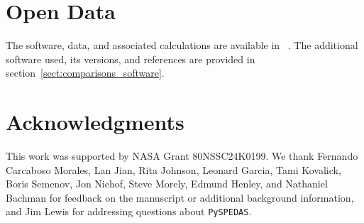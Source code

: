 \documentclass[draft]{agujournal2019}
\begin{document}
\section*{Open Data}

The software, data, and associated calculations are available in ~. The additional software used, its versions, and references are provided in section~\ref {sect:comparisons_software}.

\section*{Acknowledgments}

This work was supported by NASA Grant 80NSSC24K0199. We thank Fernando Carcaboso Morales, Lan Jian, Rita Johnson, Leonard Garcia, Tami Kovalick, Boris Semenov, Jon Niehof, Steve Morely, Edmund Henley, and Nathaniel Bachman for feedback on the manuscript or additional background information, and Jim Lewis for addressing questions about \texttt{PySPEDAS}. 

{\raggedright }
\end{document}
